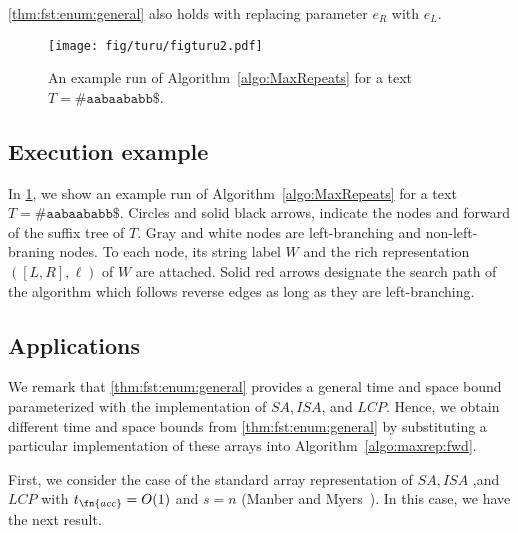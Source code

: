 \cref{thm:fst:enum:general} also holds with replacing parameter $e_R$ with $e_L$. 

\begin{figure}[t]
\centering  
  \texttt{[image: fig/turu/figturu2.pdf]}
  \caption{An example run of Algorithm~\ref{algo:MaxRepeats} for a text $T = \mathtt{\#aabaababb\$}$.
}\label{fig:run:example}
\end{figure}

\subsection{Execution example}

In \cref{fig:run:example}, we show an example run of Algorithm~\ref{algo:MaxRepeats} for a text $T = \mathtt{\#aabaababb\$}$. Circles and solid black arrows, indicate the nodes and forward of the suffix tree of $T$.
    Gray and white nodes are left-branching and non-left-braning nodes. To each node, its string label $W$ and the rich representation $([L, R], \ell)$ of $W$ are attached. Solid red arrows designate the search path of the algorithm which follows reverse edges as long as they are left-branching.



\subsection{Applications}
We remark that \cref{thm:fst:enum:general} provides a general time and space bound parameterized with the implementation of $SA, ISA$, and $LCP$. Hence, we obtain different time and space bounds from \cref{thm:fst:enum:general} by substituting a particular implementation of these arrays into Algorithm~\ref{algo:maxrep:fwd}. 

First, we consider the case of the standard array representation of $SA, ISA$ ,and $LCP$ with $t_\fn{acc} = O(1)$ and $s = n$ (Manber and Myers~\cite{ManberM93:SA}). In this case, we have the next result. 

